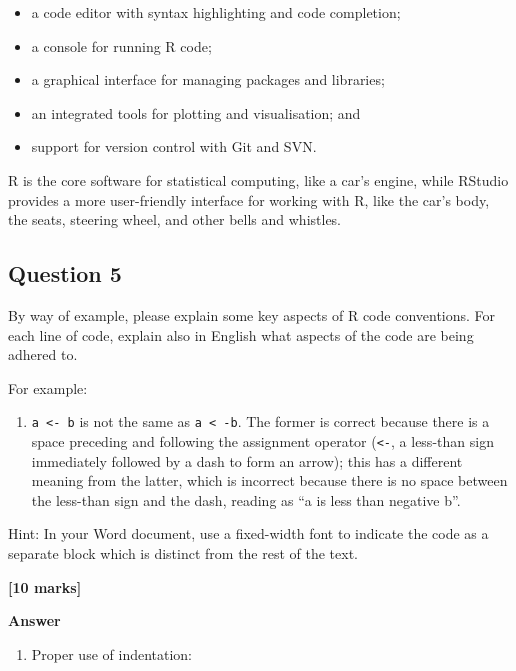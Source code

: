 \documentclass[
  10t,
]{article}
\providecommand{\tightlist}{%
  \setlength{\itemsep}{0pt}\setlength{\parskip}{0pt}}
\let\oldtexttt\texttt
\renewcommand{\texttt}[1]{\oldtexttt{\small #1}}
\begin{document}
\begin{itemize}
\tightlist
\item
  a code editor with syntax highlighting and code completion;
\item
  a console for running R code;
\item
  a graphical interface for managing packages and libraries;
\item
  an integrated tools for plotting and visualisation; and
\item
  support for version control with Git and SVN.
\end{itemize}

R is the core software for statistical computing, like a car's engine,
while RStudio provides a more user-friendly interface for working with
R, like the car's body, the seats, steering wheel, and other bells and
whistles.

\subsection{Question 5}\label{question-5}

By way of example, please explain some key aspects of R code
conventions. For each line of code, explain also in English what aspects
of the code are being adhered to.

For example:

\begin{enumerate}
\def\labelenumi{\arabic{enumi}.}
\tightlist
\item
  \texttt{a\ \textless{}-\ b} is not the same as
  \texttt{a\ \textless{}\ -b}. The former is correct because there is a
  space preceding and following the assignment operator
  (\texttt{\textless{}-}, a less-than sign immediately followed by a
  dash to form an arrow); this has a different meaning from the latter,
  which is incorrect because there is no space between the less-than
  sign and the dash, reading as ``a is less than negative b''.
\end{enumerate}

{Hint: In your Word document, use a fixed-width font to indicate the
code as a separate block which is distinct from the rest of the text.}

\textbf{{[}10 marks{]}}

\textbf{Answer}

\begin{enumerate}
\def\labelenumi{\arabic{enumi}.}
\tightlist
\item
  Proper use of indentation:
\end{enumerate}
\end{document}
